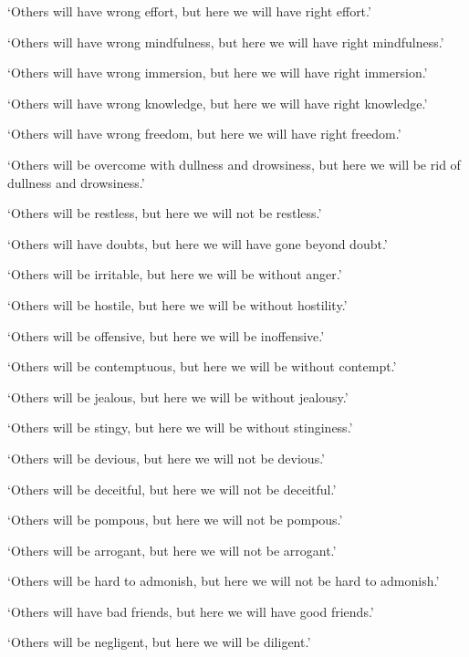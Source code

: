 \documentclass[12pt,openany]{book}%
\begin{document}
‘Others will have wrong effort, but here we will have right effort.’ 

‘Others will have wrong mindfulness, but here we will have right mindfulness.’ 

‘Others will have wrong immersion, but here we will have right immersion.’ 

‘Others will have wrong knowledge, but here we will have right knowledge.’ 

‘Others will have wrong freedom, but here we will have right freedom.’ 

‘Others will be overcome with dullness and drowsiness, but here we will be rid of dullness and drowsiness.’ 

‘Others will be restless, but here we will not be restless.’ 

‘Others will have doubts, but here we will have gone beyond doubt.’ 

‘Others will be irritable, but here we will be without anger.’ 

‘Others will be hostile, but here we will be without hostility.’ 

‘Others will be offensive, but here we will be inoffensive.’ 

‘Others will be contemptuous, but here we will be without contempt.’ 

‘Others will be jealous, but here we will be without jealousy.’ 

‘Others will be stingy, but here we will be without stinginess.’ 

‘Others will be devious, but here we will not be devious.’ 

‘Others will be deceitful, but here we will not be deceitful.’ 

‘Others will be pompous, but here we will not be pompous.’ 

‘Others will be arrogant, but here we will not be arrogant.’ 

‘Others will be hard to admonish, but here we will not be hard to admonish.’ 

‘Others will have bad friends, but here we will have good friends.’ 

‘Others will be negligent, but here we will be diligent.’ 
\end{document}
